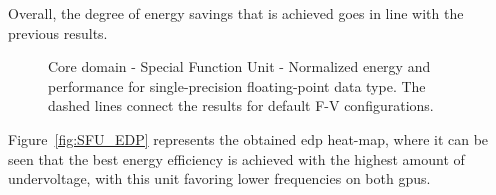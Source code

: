 Overall, the degree of energy savings that is achieved goes in line with the previous results.




\begin{figure}[!htb]
    \centering
    \begin{subfigmatrix}{2}
      \label{fig:SFU_behaviour}
    \end{subfigmatrix}
    \caption{Core domain - Special Function Unit - Normalized energy and performance for single-precision floating-point data type. The dashed lines connect the results for default F-V configurations.}
\end{figure}

Figure~\ref{fig:SFU_EDP} represents the obtained  \acrshort{edp} heat-map, where it can be seen that the best energy efficiency is achieved with the highest amount of undervoltage, with this unit favoring lower frequencies on both \acrshort{gpu}s.


